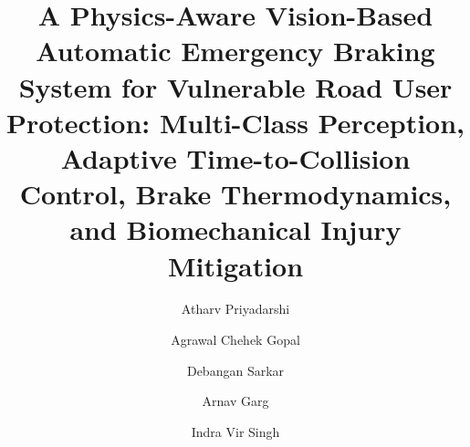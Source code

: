 \documentclass[3p,twocolumn]{elsarticle}
\begin{document}
\begin{frontmatter}

\title{A Physics-Aware Vision-Based Automatic Emergency Braking System for Vulnerable Road User Protection: Multi-Class Perception, Adaptive Time-to-Collision Control, Brake Thermodynamics, and Biomechanical Injury Mitigation}

\author[iitr]{Atharv Priyadarshi}
\author[iitr]{Agrawal Chehek Gopal}
\author[iitr]{Debangan Sarkar}
\author[iitr]{Arnav Garg}
\author[iitr]{Indra Vir Singh}

\address[iitr]{Department of Mechanical and Industrial Engineering, Indian Institute of Technology Roorkee, Roorkee 247667, Uttarakhand, India}

\begin{abstract}

\end{abstract}
\end{frontmatter}
\end{document}
